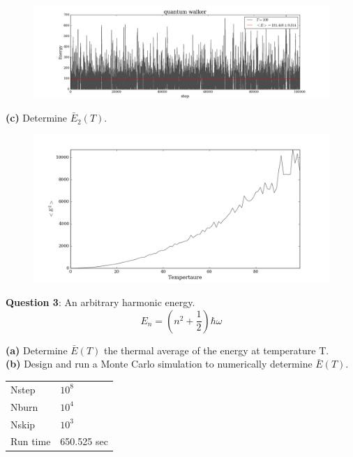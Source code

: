 \documentclass{article}
\begin{document}
\begin{figure}[H]
\begin{center}
\includegraphics[width=16cm]{../output/quantum/walkers.png} 
\end{center}
\end{figure}

\textbf{(c)} Determine $\bar{E}_{2}(T)$. 

\begin{figure}[H]
\begin{center}
\includegraphics[width=16cm]{../output/quantum/expected_sq.png} 
\end{center}
\end{figure}


\bigskip
\textbf{Question 3}: An arbitrary harmonic energy. 
	\[E_{n} = \left(n^2 + \frac{1}{2} \right)\hbar\omega \]

\textbf{(a)} Determine $\bar{E}(T)$ the thermal average of the energy at temperature T. \\

\textbf{(b)} Design and run a Monte Carlo simulation to numerically determine $\bar{E}(T)$. \\

\begin{table}[H]
\centering
\begin{tabular}{|l|l|}
	\hline
	Nstep    & $10^8$ \\
	Nburn    & $10^4$ \\
	Nskip    & $10^3$ \\
	Run time & 650.525 sec \\
	\hline
\end{tabular}
\end{table}
\end{document}

